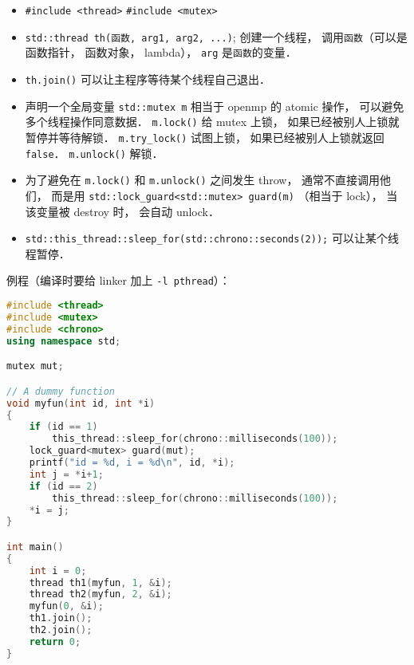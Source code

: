
\begin{itemize}
\item \verb|#include <thread>| \verb|#include <mutex>|
\item \verb|std::thread th(函数, arg1, arg2, ...)|; 创建一个线程， 调用\verb|函数|（可以是函数指针， 函数对象， lambda）， \verb|arg| 是\verb|函数|的变量．
\item \verb|th.join()| 可以让主程序等待某个线程自己退出．
\item 声明一个全局变量 \verb|std::mutex m| 相当于 openmp 的 atomic 操作， 可以避免多个线程操作同意数据． \verb|m.lock()| 给 mutex 上锁， 如果已经被别人上锁就暂停并等待解锁． \verb|m.try_lock()| 试图上锁， 如果已经被别人上锁就返回 \verb|false|． \verb|m.unlock()| 解锁．
\item 为了避免在 \verb|m.lock()| 和 \verb|m.unlock()| 之间发生 throw， 通常不直接调用他们， 而是用 \verb|std::lock_guard<std::mutex> guard(m)| （相当于 lock）， 当该变量被 destroy 时， 会自动 unlock．
\item \verb|std::this_thread::sleep_for(std::chrono::seconds(2));| 可以让某个线程暂停．
\end{itemize}

例程（编译时要给 linker 加上 \verb|-l pthread|）：
\begin{lstlisting}[language=cpp]
#include <thread>
#include <mutex>
#include <chrono>
using namespace std;

mutex mut;

// A dummy function
void myfun(int id, int *i)
{
    if (id == 1)
        this_thread::sleep_for(chrono::milliseconds(100));
    lock_guard<mutex> guard(mut);
    printf("id = %d, i = %d\n", id, *i);
    int j = *i+1;
    if (id == 2)
        this_thread::sleep_for(chrono::milliseconds(100));
    *i = j;
}

int main()
{
    int i = 0;
    thread th1(myfun, 1, &i);
    thread th2(myfun, 2, &i);
    myfun(0, &i);
    th1.join();
    th2.join();
    return 0;
}
\end{lstlisting}

